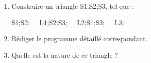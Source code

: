 \documentclass[exercice]{thedocument}%
\begin{document}
%
\begin{enumerate}
    \item Construire un triangle \<S1;\<S2;\<S3; tel que :\par\vspace{10pt}
    \<S1;\<S2; = \<L1;\quad\<S2;\<S3; = \<L2;\quad\<S1;\<S3; = \<L3;
    \item Rédiger le programme détaillé correspondant.
    \item Quelle est la nature de ce triangle ?
\end{enumerate}
\end{document}
